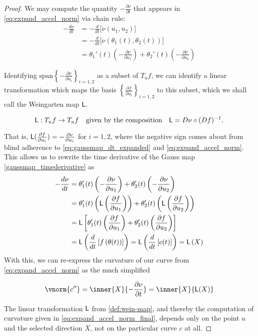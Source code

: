 \begin{proof}
	We may compute the quantity $-\frac{\partial \nu}{\partial t}$ that appears in
	\cref{eq:expand_accel_norm} via chain rule:
	\begin{align} \label{gaussmap_timederivative}
	-\frac{d \nu}{dt} &= -\frac{d}{dt}\big[\nu(u_1, u_2)\big] \\
	&= -\frac{d}{dt}\big[\nu(\theta_1(t), \theta_2(t))\big] \\
	&= \theta_1'(t)\left( - \frac{\partial \nu}{\partial u_1} \right) + 
	\theta_2'(t)\left( - \frac{\partial \nu}{\partial u_2} \right) \label{eq:gaussmap_dt_expanded}
	\end{align}
	
	
	Identifying $\textrm{span}\left\{ - \frac{\partial \nu}{\partial u_i}\right\}_{i=1,2}$ as a subset of $T_u f$,  we can identify a linear transformation which maps the basis
	$\left\{ \frac{\partial f}{\partial u_i}\right\}_{i=1,2}$ to this subset, which we shall call
	the Weingarten map $\mathsf{L}$.
	
	\begin{defn} \label{def:wein-map}
		\[
		\mathsf{L}: T_u f \to T_u f 
		\quad \textrm{given by the composition} \quad
		\mathsf{L} = D\nu \circ (Df)^{-1}.
		\]
	\end{defn}
	That is, $\mathsf{L}(\frac{\partial f}{\partial u_i}) = - \frac{\partial \nu}{\partial u_i} $ for $i=1,2$, where the negative sign comes about from blind adherence to \cref{eq:gaussmap_dt_expanded} and \cref{eq:expand_accel_norm}. This allows us to rewrite the time derivative of the Gauss map \cref{gaussmap_timederivative} as
		\begin{align}
		-\frac{d \nu}{dt} &= 
		\theta_1'(t)\left( - \frac{\partial \nu}{\partial u_1} \right) + 
		\theta_2'(t)\left( - \frac{\partial \nu}{\partial u_2} \right) \\
		&= \theta_1'(t)\left( \mathsf{L}\left(\frac{\partial f}{\partial u_1}\right) \right) + 
		\theta_2'(t)\left( \mathsf{L}\left(\frac{\partial f}{\partial u_2}\right) \right) \\
		&= \mathsf{L}\left[\theta_1'(t)\left( \frac{\partial f}{\partial u_1}\right)  + 
		\theta_2'(t)\left( \frac{\partial f}{\partial u_2} \right)\right] \\
		&= \mathsf{L}\left(\frac{d}{dt}\left[ f\left(\theta(t)\right)\right] \right)
		= \mathsf{L}\left( \frac{d}{dt} \left[ c(t) \right] \right) = \mathsf{L}\left(X\right)
		\end{align} 
		With this, we can re-express the curvature of our curve from
		\cref{eq:expand_accel_norm} as the much simplified
		
		\begin{equation} \label{eq:expand_accel_norm_final}
		\vnorm{c''} = \inner{X}{-\frac{\partial \nu}{\partial t}} = \inner{X}{\wein(X)}
		\end{equation}
		
	
	The linear transformation $\mathsf{L}$ from \cref{def:wein-map}, and thereby
	the computation of curvature given in \cref{eq:expand_accel_norm_final},
	depends only on the point $u$ and the selected direction $X$, not on the particular curve $c$ at all.
	\end{proof}
